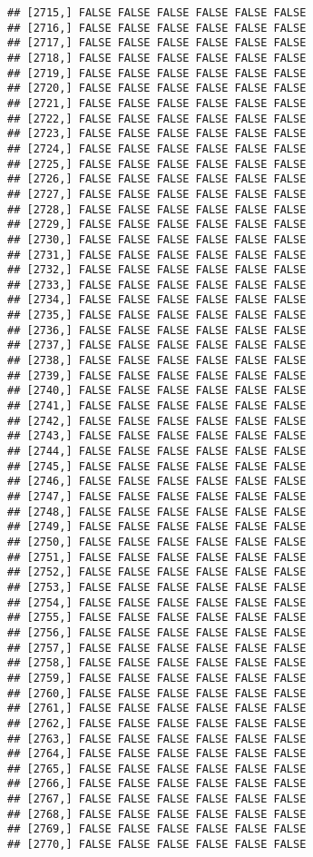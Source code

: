 \documentclass[
]{article}
\begin{document}
\begin{verbatim}
## [2715,] FALSE FALSE FALSE FALSE FALSE FALSE
## [2716,] FALSE FALSE FALSE FALSE FALSE FALSE
## [2717,] FALSE FALSE FALSE FALSE FALSE FALSE
## [2718,] FALSE FALSE FALSE FALSE FALSE FALSE
## [2719,] FALSE FALSE FALSE FALSE FALSE FALSE
## [2720,] FALSE FALSE FALSE FALSE FALSE FALSE
## [2721,] FALSE FALSE FALSE FALSE FALSE FALSE
## [2722,] FALSE FALSE FALSE FALSE FALSE FALSE
## [2723,] FALSE FALSE FALSE FALSE FALSE FALSE
## [2724,] FALSE FALSE FALSE FALSE FALSE FALSE
## [2725,] FALSE FALSE FALSE FALSE FALSE FALSE
## [2726,] FALSE FALSE FALSE FALSE FALSE FALSE
## [2727,] FALSE FALSE FALSE FALSE FALSE FALSE
## [2728,] FALSE FALSE FALSE FALSE FALSE FALSE
## [2729,] FALSE FALSE FALSE FALSE FALSE FALSE
## [2730,] FALSE FALSE FALSE FALSE FALSE FALSE
## [2731,] FALSE FALSE FALSE FALSE FALSE FALSE
## [2732,] FALSE FALSE FALSE FALSE FALSE FALSE
## [2733,] FALSE FALSE FALSE FALSE FALSE FALSE
## [2734,] FALSE FALSE FALSE FALSE FALSE FALSE
## [2735,] FALSE FALSE FALSE FALSE FALSE FALSE
## [2736,] FALSE FALSE FALSE FALSE FALSE FALSE
## [2737,] FALSE FALSE FALSE FALSE FALSE FALSE
## [2738,] FALSE FALSE FALSE FALSE FALSE FALSE
## [2739,] FALSE FALSE FALSE FALSE FALSE FALSE
## [2740,] FALSE FALSE FALSE FALSE FALSE FALSE
## [2741,] FALSE FALSE FALSE FALSE FALSE FALSE
## [2742,] FALSE FALSE FALSE FALSE FALSE FALSE
## [2743,] FALSE FALSE FALSE FALSE FALSE FALSE
## [2744,] FALSE FALSE FALSE FALSE FALSE FALSE
## [2745,] FALSE FALSE FALSE FALSE FALSE FALSE
## [2746,] FALSE FALSE FALSE FALSE FALSE FALSE
## [2747,] FALSE FALSE FALSE FALSE FALSE FALSE
## [2748,] FALSE FALSE FALSE FALSE FALSE FALSE
## [2749,] FALSE FALSE FALSE FALSE FALSE FALSE
## [2750,] FALSE FALSE FALSE FALSE FALSE FALSE
## [2751,] FALSE FALSE FALSE FALSE FALSE FALSE
## [2752,] FALSE FALSE FALSE FALSE FALSE FALSE
## [2753,] FALSE FALSE FALSE FALSE FALSE FALSE
## [2754,] FALSE FALSE FALSE FALSE FALSE FALSE
## [2755,] FALSE FALSE FALSE FALSE FALSE FALSE
## [2756,] FALSE FALSE FALSE FALSE FALSE FALSE
## [2757,] FALSE FALSE FALSE FALSE FALSE FALSE
## [2758,] FALSE FALSE FALSE FALSE FALSE FALSE
## [2759,] FALSE FALSE FALSE FALSE FALSE FALSE
## [2760,] FALSE FALSE FALSE FALSE FALSE FALSE
## [2761,] FALSE FALSE FALSE FALSE FALSE FALSE
## [2762,] FALSE FALSE FALSE FALSE FALSE FALSE
## [2763,] FALSE FALSE FALSE FALSE FALSE FALSE
## [2764,] FALSE FALSE FALSE FALSE FALSE FALSE
## [2765,] FALSE FALSE FALSE FALSE FALSE FALSE
## [2766,] FALSE FALSE FALSE FALSE FALSE FALSE
## [2767,] FALSE FALSE FALSE FALSE FALSE FALSE
## [2768,] FALSE FALSE FALSE FALSE FALSE FALSE
## [2769,] FALSE FALSE FALSE FALSE FALSE FALSE
## [2770,] FALSE FALSE FALSE FALSE FALSE FALSE

\end{verbatim}
\end{document}
